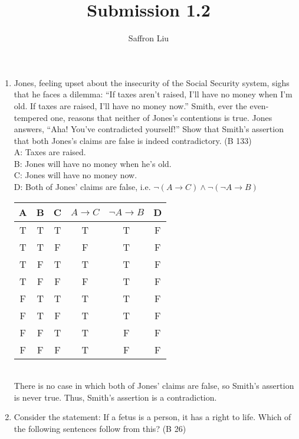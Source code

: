 \documentclass{article}
\title{Submission 1.2}
\author{Saffron Liu}
\date{}
\begin{document}
\maketitle

\begin{enumerate}
    \item Jones, feeling upset about the insecurity of the Social Security system, sighs that he faces a dilemma: “If taxes aren't raised, I'll have no money when I'm old. If taxes are raised, I'll have no money now.” Smith, ever the even-tempered one, reasons that neither of Jones's contentions is true. Jones answers, “Aha! You've contradicted yourself!” Show that Smith's assertion that both Jones's claims are false is indeed contradictory. (B 133)\\
          A: Taxes are raised.\\
          B: Jones will have no money when he's old.\\
          C: Jones will have no money now.\\
          D: Both of Jones' claims are false, i.e. $\neg (A \to C) \land \neg (\neg A \to B)$\\
          \begin{tabular}{c|c|c|c|c|c}
              A & B & C & $A \to C$ & $\neg A \to B$ & D \\
              \hline
              T & T & T & T         & T              & F \\
              T & T & F & F         & T              & F \\
              T & F & T & T         & T              & F \\
              T & F & F & F         & T              & F \\
              F & T & T & T         & T              & F \\
              F & T & F & T         & T              & F \\
              F & F & T & T         & F              & F \\
              F & F & F & T         & F              & F \\
          \end{tabular}\\
          There is no case in which both of Jones' claims are false, so Smith's assertion is never true. Thus, Smith's assertion is a contradiction.
    \item Consider the statement: If a fetus is a person, it has a right to life. Which of the following sentences follow from this? (B 26)\\

\end{enumerate}
\end{document}
